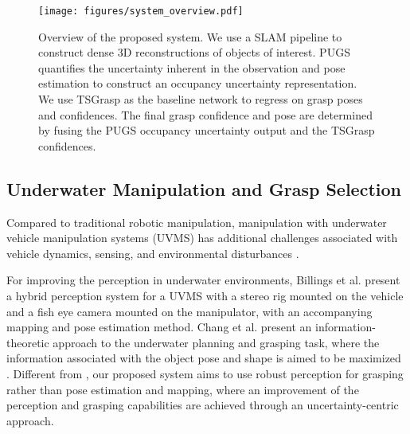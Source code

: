 \begin{figure*}[t!]
    \centering
    \texttt{[image: figures/system\_overview.pdf]}
    \caption{Overview of the proposed system. We use a SLAM pipeline to construct dense 3D reconstructions of objects of interest.
    PUGS quantifies the uncertainty inherent in the observation and pose estimation to construct an occupancy uncertainty representation. We use TSGrasp \cite{player_real-time_2023} as the baseline network to regress on grasp poses and confidences.
    The final grasp confidence and pose are determined by fusing the PUGS occupancy uncertainty output and the TSGrasp confidences.}
    \label{fig:overview}
\end{figure*}
\subsection{Underwater Manipulation and Grasp Selection}
Compared to traditional robotic manipulation, manipulation with underwater vehicle manipulation systems (UVMS) has additional challenges associated with vehicle dynamics, sensing, and environmental disturbances \cite{billings_hybrid_2022, chang_adaptive_nodate, player_real-time_2023}.

For improving the perception in underwater environments, Billings et al. present a hybrid perception system for a UVMS with a stereo rig mounted on the vehicle and a fish eye camera mounted on the manipulator, with an accompanying mapping and pose estimation method\cite{billings_hybrid_2022}.
Chang et al. present an information-theoretic approach to the underwater planning and grasping task, where the information associated with the object pose and shape is aimed to be maximized \cite{chang_adaptive_nodate}.
Different from \cite{billings_hybrid_2022}, our proposed system aims to use robust perception for grasping rather than pose estimation and mapping, where an improvement of the perception and grasping capabilities are achieved through an uncertainty-centric approach. 

